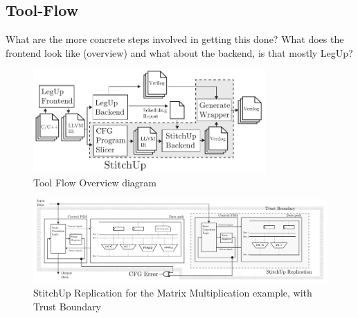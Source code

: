 \subsection{Tool-Flow}
What are the more concrete steps involved in getting this done?
What does the frontend look like (overview) and what about the backend,
is that mostly LegUp?

\begin{figure}
\centering
\includegraphics[width=3.5in]{./imgs/tool-flow.pdf}
\caption{Tool Flow Overview diagram}
\label{fig:tool_flow_diagram}
\end{figure}



\begin{figure}[!t]
\centering
\includegraphics[width=7in]{./imgs/HLSArch.pdf}
\caption{StitchUp Replication for the Matrix Multiplication example, with Trust Boundary}
\label{fig:HLSArch}
\end{figure}

